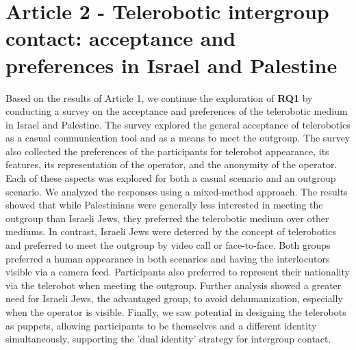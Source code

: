 \documentclass[dissertation,math,vertlayout,pdfa,colorlinks,nologo]{aaltoseries}
\begin{document}
\section{Article 2 - Telerobotic intergroup contact: acceptance and preferences in Israel and Palestine}
Based on the results of Article 1, we continue the exploration of \textbf{RQ1} by conducting a survey on the acceptance and preferences of the telerobotic medium in Israel and Palestine. The survey explored the general acceptance of telerobotics as a casual communication tool and as a means to meet the outgroup. The survey also collected the preferences of the participants for telerobot appearance, its features, its representation of the operator, and the anonymity of the operator. Each of these aspects was explored for both a casual scenario and an outgroup scenario. We analyzed the responses using a mixed-method approach. The results showed that while Palestinians were generally less interested in meeting the outgroup than Israeli Jews, they preferred the telerobotic medium over other mediums. In contrast, Israeli Jews were deterred by the concept of telerobotics and preferred to meet the outgroup by video call or face-to-face. Both groups preferred a human appearance in both scenarios and having the interlocutors visible via a camera feed. Participants also preferred to represent their nationality via the telerobot when meeting the outgroup. Further analysis showed a greater need for Israeli Jews, the advantaged group, to avoid dehumanization, especially when the operator is visible. Finally, we saw potential in designing the telerobots as puppets, allowing participants to be themselves and a different identity simultaneously, supporting the 'dual identity' strategy for intergroup contact.
\end{document}
